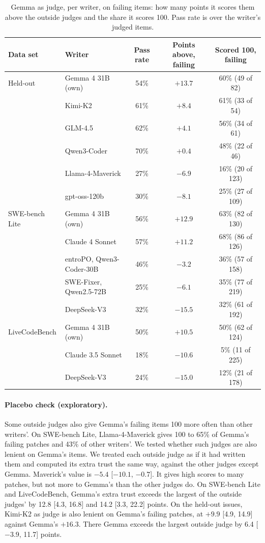 \documentclass[10pt,letterpaper]{article}
\begin{document}
\begin{table}[H]
\centering
\small
\caption{Gemma as judge, per writer, on failing items: how many points it scores them above the outside judges and the
share it scores 100. Pass rate is over the writer's judged items.}
\label{tab:perwriter}
\begin{tabular}{@{}llccc@{}}
\toprule
Data set & Writer & Pass rate & Points above, failing & Scored 100, failing \\
\midrule
Held-out & Gemma 4 31B (own) & 54\% & $+13.7$ & 60\% (49 of 82) \\
 & Kimi-K2 & 61\% & $+8.4$ & 61\% (33 of 54) \\
 & GLM-4.5 & 62\% & $+4.1$ & 56\% (34 of 61) \\
 & Qwen3-Coder & 70\% & $+0.4$ & 48\% (22 of 46) \\
 & Llama-4-Maverick & 27\% & $-6.9$ & 16\% (20 of 123) \\
 & gpt-oss-120b & 30\% & $-8.1$ & 25\% (27 of 109) \\
\midrule
SWE-bench Lite & Gemma 4 31B (own) & 56\% & $+12.9$ & 63\% (82 of 130) \\
 & Claude 4 Sonnet & 57\% & $+11.2$ & 68\% (86 of 126) \\
 & entroPO, Qwen3-Coder-30B & 46\% & $-3.2$ & 36\% (57 of 158) \\
 & SWE-Fixer, Qwen2.5-72B & 25\% & $-6.1$ & 35\% (77 of 219) \\
 & DeepSeek-V3 & 32\% & $-15.5$ & 32\% (61 of 192) \\
\midrule
LiveCodeBench & Gemma 4 31B (own) & 50\% & $+10.5$ & 50\% (62 of 124) \\
 & Claude 3.5 Sonnet & 18\% & $-10.6$ & 5\% (11 of 225) \\
 & DeepSeek-V3 & 24\% & $-15.0$ & 12\% (21 of 178) \\
\bottomrule
\end{tabular}
\end{table}

\paragraph{Placebo check (exploratory).} Some outside judges also give Gemma's failing items 100 more often than other
writers'. On SWE-bench Lite, Llama-4-Maverick gives 100 to 65\% of Gemma's failing patches and 43\% of other writers'.
We tested whether such judges are also lenient on Gemma's items. We treated each outside judge as if it had written
them and computed its extra trust the same way, against the other judges except Gemma. Maverick's value is $-5.4$ %
[$-10.1$, $-0.7$]. It gives high scores to many patches, but not more to Gemma's than the other judges do. On SWE-bench
Lite and LiveCodeBench, Gemma's extra trust exceeds the largest of the outside judges' by 12.8 [4.3, 16.8] and 14.2 [3.3,
22.2] points. On the held-out issues, Kimi-K2 as judge is also lenient on Gemma's failing patches, at $+9.9$ [4.9,
14.9] against Gemma's $+16.3$. There Gemma exceeds the largest outside judge by 6.4 [$-3.9$, 11.7] points.
\end{document}
